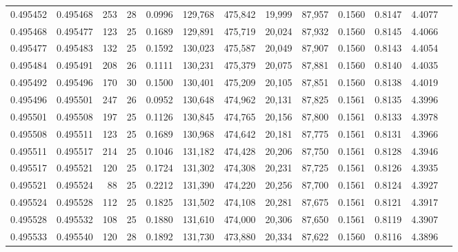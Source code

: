 \begin{tabular}{rrrrrrrrrrrrr}
0.495452 & 0.495468 & 253 &  28 &                                     0.0996 & 129,768 & 475,842 &  19,999 &  87,957 & 0.1560 & 0.8147 & 4.4077 \\
0.495468 & 0.495477 & 123 &  25 &                                     0.1689 & 129,891 & 475,719 &  20,024 &  87,932 & 0.1560 & 0.8145 & 4.4066 \\
0.495477 & 0.495483 & 132 &  25 &                                     0.1592 & 130,023 & 475,587 &  20,049 &  87,907 & 0.1560 & 0.8143 & 4.4054 \\
0.495484 & 0.495491 & 208 &  26 &                                     0.1111 & 130,231 & 475,379 &  20,075 &  87,881 & 0.1560 & 0.8140 & 4.4035 \\
0.495492 & 0.495496 & 170 &  30 &                                     0.1500 & 130,401 & 475,209 &  20,105 &  87,851 & 0.1560 & 0.8138 & 4.4019 \\
0.495496 & 0.495501 & 247 &  26 &                                     0.0952 & 130,648 & 474,962 &  20,131 &  87,825 & 0.1561 & 0.8135 & 4.3996 \\
0.495501 & 0.495508 & 197 &  25 &                                     0.1126 & 130,845 & 474,765 &  20,156 &  87,800 & 0.1561 & 0.8133 & 4.3978 \\
0.495508 & 0.495511 & 123 &  25 &                                     0.1689 & 130,968 & 474,642 &  20,181 &  87,775 & 0.1561 & 0.8131 & 4.3966 \\
0.495511 & 0.495517 & 214 &  25 &                                     0.1046 & 131,182 & 474,428 &  20,206 &  87,750 & 0.1561 & 0.8128 & 4.3946 \\
0.495517 & 0.495521 & 120 &  25 &                                     0.1724 & 131,302 & 474,308 &  20,231 &  87,725 & 0.1561 & 0.8126 & 4.3935 \\
0.495521 & 0.495524 &  88 &  25 &                                     0.2212 & 131,390 & 474,220 &  20,256 &  87,700 & 0.1561 & 0.8124 & 4.3927 \\
0.495524 & 0.495528 & 112 &  25 &                                     0.1825 & 131,502 & 474,108 &  20,281 &  87,675 & 0.1561 & 0.8121 & 4.3917 \\
0.495528 & 0.495532 & 108 &  25 &                                     0.1880 & 131,610 & 474,000 &  20,306 &  87,650 & 0.1561 & 0.8119 & 4.3907 \\
0.495533 & 0.495540 & 120 &  28 &                                     0.1892 & 131,730 & 473,880 &  20,334 &  87,622 & 0.1560 & 0.8116 & 4.3896 \\

\end{tabular}
